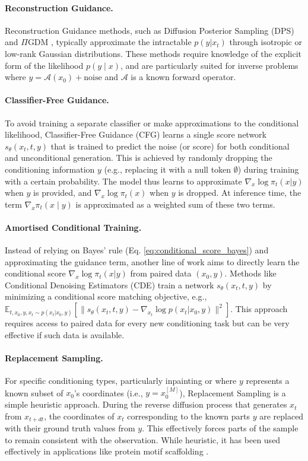 \paragraph{Reconstruction Guidance.} Reconstruction Guidance methods, such as Diffusion Posterior Sampling (DPS) \parencite{chung2022diffusion} and $\Pi$GDM \parencite{song2022pseudoinverse}, typically approximate the intractable $p(y|x_t)$ through isotropic or low-rank Gaussian distributions. These methods require knowledge of the explicit form of the likelihood $p(y \mid x)$, and are particularly suited for inverse problems where $y = \mathcal{A}(x_0) + \text{noise}$ and $\mathcal{A}$ is a known forward operator.

\paragraph{Classifier-Free Guidance.} To avoid training a separate classifier or make approximations to the conditional likelihood, Classifier-Free Guidance (CFG) \parencite{ho2022classifier} learns a single score network $s_\theta(x_t, t, y)$ that is trained to predict the noise (or score) for both conditional and unconditional generation. This is achieved by randomly dropping the conditioning information $y$ (e.g., replacing it with a null token $\emptyset$) during training with a certain probability. The model thus learns to approximate $\nabla_x \log \pi_t(x|y)$ when $y$ is provided, and $\nabla_x \log \pi_t(x)$ when $y$ is dropped. At inference time, the term $\nabla_x \pi_t(x \mid y)$ is approximated as a weighted sum of these two terms.
\paragraph{Amortised Conditional Training.} Instead of relying on Bayes' rule (Eq. \ref{eq:conditional_score_bayes}) and approximating the guidance term, another line of work aims to directly learn the conditional score $\nabla_x \log \pi_t(x|y)$ from paired data $(x_0, y)$. Methods like Conditional Denoising Estimators (CDE) \parencite{batzolis2021conditional} train a network $s_\theta(x_t, t, y)$ by minimizing a conditional score matching objective, e.g., $\mathbb{E}_{t, x_0, y, x_t \sim p(x_t|x_0,y)} [\| s_\theta(x_t, t, y) - \nabla_{x_t} \log p(x_t|x_0,y) \|^2]$. This approach requires access to paired data for every new conditioning task but can be very effective if such data is available.
\paragraph{Replacement Sampling.} For specific conditioning types, particularly inpainting or where $y$ represents a known subset of $x_0$'s coordinates (i.e., $y = x_0^{[M]}$), Replacement Sampling is a simple heuristic approach. During the reverse diffusion process that generates $x_t$ from $x_{t+dt}$, the coordinates of $x_t$ corresponding to the known parts $y$ are replaced with their ground truth values from $y$. This effectively forces parts of the sample to remain consistent with the observation. While heuristic, it has been used effectively in applications like protein motif scaffolding \parencite{watson2023novo}.

